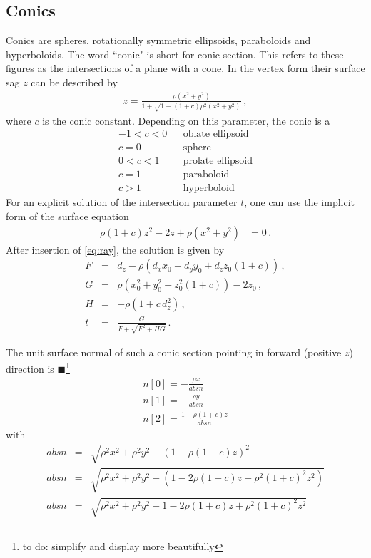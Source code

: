 \documentclass[12pt,a4paper,twoside,openright,BCOR10mm,headsepline,titlepage,abstracton,chapterprefix,final]{scrreprt}
\newcommand{\remark}[1]{{\color{red}$\blacksquare$}\footnote{{\color{red}#1}}}
\begin{document}
\subsection{Conics}
Conics are spheres, rotationally symmetric ellipsoids, paraboloids and hyperboloids.
The word ``conic" is short for conic section. This refers to these figures as the
intersections of a plane with a cone.
In the vertex form their surface sag $z$ can be described by
\begin{eqnarray}
 z =  \frac
 { \rho ( x^2 + y^2 ) }
 { 1 + \sqrt{1 - (1+c) \rho^2  (x^2 + y^2)} }\,,
\end{eqnarray}
where $c$ is the conic constant. Depending on this parameter, the conic is a
\begin{eqnarray*}
-1 < c < 0 && \textrm{oblate ellipsoid} \\
     c = 0 && \textrm{sphere} \\
 0 < c < 1 && \textrm{prolate ellipsoid} \\
     c = 1 && \textrm{paraboloid} \\
     c > 1 && \textrm{hyperboloid}
\end{eqnarray*}
For an explicit solution of the intersection parameter $t$,
one can use the implicit form of the surface equation
\begin{align}
 \rho (1 + c) z^2 - 2 z + \rho (x^2 + y^2) &=0\,.
\end{align}
After insertion of \eqref{eq:ray}, the solution is given by
\begin{subequations}
\label{eq:intersectionconicsection}
\begin{eqnarray}
   F &=& d_z - \rho \left( d_x x_0 + d_y y_0 + d_z z_0 (1+c) \right)\,, \\
   G &=& \rho (x_0^2 + y_0^2 + z_0^2 (1+c)) - 2 z_0\,, \\
   H &=& - \rho ( 1 + c \, d_z^2 )\,, \\
   t &=& \frac{G}{ F + \sqrt{F^2 + H G} }\,.
\end{eqnarray}
\end{subequations}

The unit surface normal of such a conic section pointing in forward (positive $z$) direction is \remark{to do: simplify and display more beautifully}
\begin{eqnarray}
n[0] = - \frac{\rho x}{absn} \\
n[1] = - \frac{\rho y}{absn} \\
n[2] = \frac{1 - \rho ( 1 + c ) z}{absn}
\end{eqnarray}
with
\begin{align}
 absn &=& \sqrt{ \rho^2 x^2 + \rho^2 y^2 + \left( 1 - \rho ( 1 + c ) z \right)^2} \\
 absn &=& \sqrt{ \rho^2 x^2 + \rho^2 y^2 + \left( 1 - 2 \rho ( 1 + c ) z + \rho^2 ( 1 + c )^2 z^2\right)} \\
 absn &=& \sqrt{ \rho^2 x^2 + \rho^2 y^2 + 1 - 2 \rho ( 1 + c ) z + \rho^2 ( 1 + c )^2 z^2 }
\end{align}
\end{document}

